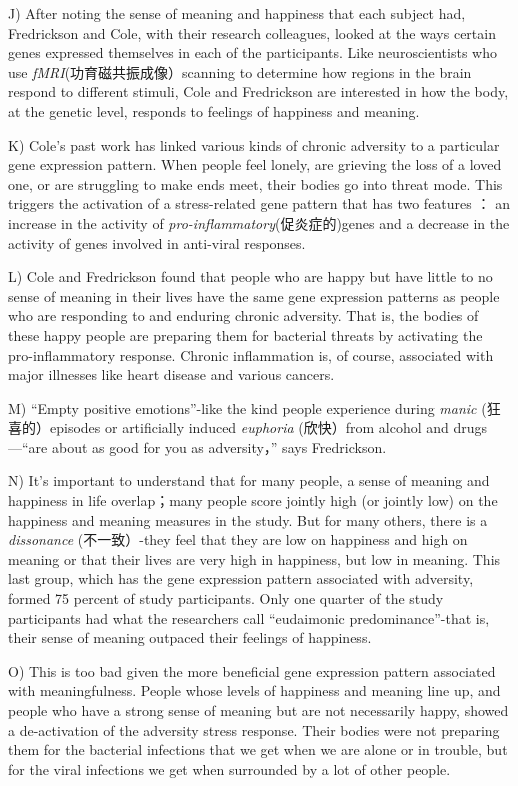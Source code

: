 \documentclass[UTF8,11pt]{ctexart}
\begin{document}
J) After noting the sense of meaning and happiness that each subject had, Fredrickson and Cole, with their research colleagues, looked at the ways certain genes expressed themselves in each of the participants. Like neuroscientists who use\textit{ fMRI}(功育磁共振成像）scanning to determine how regions in the brain respond to different stimuli, Cole and Fredrickson are interested in how the body, at the genetic level, responds to feelings of happiness and meaning.


K) Cole’s past work has linked various kinds of chronic adversity to a particular gene expression pattern. When people feel lonely, are grieving the loss of a loved one, or are struggling to make ends meet, their bodies go into threat mode. This triggers the activation of a stress-related gene pattern that has two features ： an increase in the activity of \textit{pro-inflammatory}(促炎症的)genes and a decrease in the activity of genes involved in anti-viral responses.


L) Cole and Fredrickson found that people who are happy but have little to no sense of meaning in their lives have the same gene expression patterns as people who are responding to and enduring chronic adversity. That is, the bodies of these happy people are preparing them for bacterial threats by activating the pro-inflammatory response. Chronic inflammation is, of course, associated with major illnesses like heart disease and various cancers.


M) “Empty positive emotions”-like the kind people experience during\textit{ manic} (狂喜的）episodes or artificially induced\textit{ euphoria} (欣快）from alcohol and drugs—“are about as good for you as adversity，” says Fredrickson.


N) It’s important to understand that for many people, a sense of meaning and happiness in life overlap；many people score jointly high (or jointly low) on the happiness and meaning measures in the study. But for many others, there is a\textit{ dissonance} (不一致）-they feel that they are low on happiness and high on meaning or that their lives are very high in happiness, but low in meaning. This last group, which has the gene expression pattern associated with adversity, formed 75 percent of study participants. Only one quarter of the study participants had what the researchers call “eudaimonic predominance”-that is, their sense of meaning outpaced their feelings of happiness.


O) This is too bad given the more beneficial gene expression pattern associated with meaningfulness. People whose levels of happiness and meaning line up, and people who have a strong sense of meaning but are not necessarily happy, showed a de-activation of the adversity stress response. Their bodies were not preparing them for the bacterial infections that we get when we are alone or in trouble, but for the viral infections we get when surrounded by a lot of other people.
\end{document}
